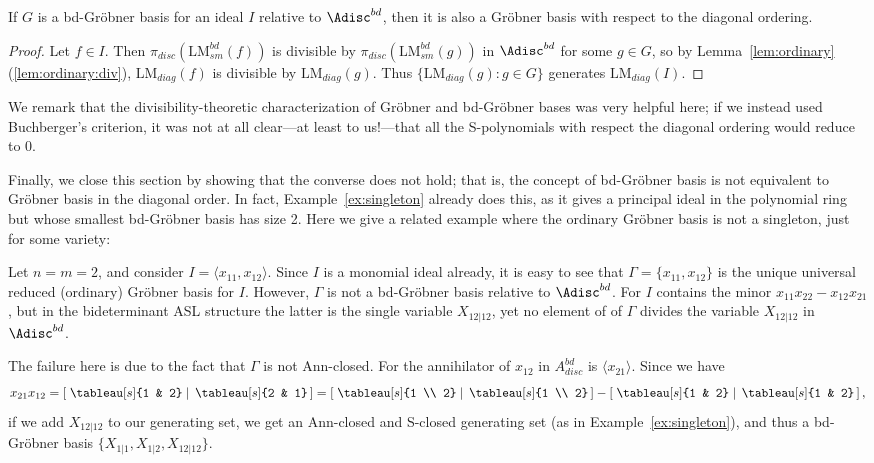 \documentclass[11pt,reqno]{amsart}
\newcommand{\bigbitab}[2]{\left[\,\left. #1\;\right|\;#2\,\right]}
\newcommand{\lm}{\text{LM}}
\newcommand{\lmsm}{\text{LM}_{sm}}
\theoremstyle{definition}
\numberwithin{equation}{section}
\begin{document}
\begin{theorem} \label{thm:gb_diag}
If $G$ is a bd-Gr\"{o}bner basis for an ideal $I$ relative to $\Adisc^{bd}$, then it is also a Gr\"{o}bner basis with respect to the diagonal ordering.
\end{theorem}

\begin{proof}
Let $f \in I$. Then $\pi_{disc}(\lmsm^{bd}(f))$ is divisible by $\pi_{disc}(\lmsm^{bd}(g))$ in $\Adisc^{bd}$ for some $g \in G$, so by Lemma~\ref{lem:ordinary}(\ref{lem:ordinary:div}), $\lm_{diag}(f)$ is divisible by $\lm_{diag}(g)$. Thus $\{\lm_{diag}(g) : g \in G\}$ generates $\lm_{diag}(I)$.
\end{proof}

We remark that the divisibility-theoretic characterization of Gr\"{o}bner and bd-Gr\"{o}bner bases was very helpful here; if we instead used Buchberger's criterion, it was not at all clear---at least to us!---that all the S-polynomials with respect the diagonal ordering would reduce to 0.

Finally, we close this section by showing that the converse does not hold; that is, the concept of bd-Gr\"{o}bner basis is not equivalent to Gr\"{o}bner basis in the diagonal order. In fact, Example~\ref{ex:singleton} already does this, as it gives a principal ideal in the polynomial ring but whose smallest bd-Gröbner basis has size 2. Here we give a related example where the ordinary Gröbner basis is not a singleton, just for some variety:

\begin{example}
Let $n=m=2$, and consider $I = \langle x_{11}, x_{12} \rangle$. Since $I$ is a monomial ideal already, it is easy to see that $\Gamma = \{x_{11}, x_{12}\}$ is the unique universal reduced (ordinary) Gr\"{o}bner basis for $I$. However, $\Gamma$ is not a bd-Gr\"{o}bner basis relative to $\Adisc^{bd}$. For $I$ contains the minor $x_{11} x_{22} - x_{12} x_{21}$, but in the bideterminant ASL structure the latter is the single variable $X_{12|12}$, yet no element of of $\Gamma$ divides the variable $X_{12|12}$ in $\Adisc^{bd}$.

The failure here is due to the fact that $\Gamma$ is not Ann-closed. For the annihilator of $x_{12}$ in $A^{bd}_{disc}$ is $\langle x_{21} \rangle$.
Since we have 
\[
x_{21}x_{12} = \bigbitab{\tableau[s]{1 & 2}}{\tableau[s]{2 & 1}} = \bigbitab{\tableau[s]{1 \\ 2}}{\tableau[s]{1 \\ 2}} - \bigbitab{\tableau[s]{1 & 2}}{\tableau[s]{1 & 2}},
\]
if we add $X_{12|12}$ to our generating set, we get an Ann-closed and S-closed generating set (as in Example~\ref{ex:singleton}), and thus a bd-Gröbner basis $\{X_{1|1}, X_{1|2}, X_{12|12}\}$.
\end{example}
\end{document}
